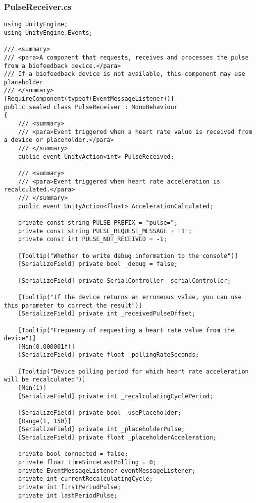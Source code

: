 \subsubsection*{PulseReceiver.cs}
\begin{verbatim}
using UnityEngine;
using UnityEngine.Events;

/// <summary>
/// <para>A component that requests, receives and processes the pulse from a biofeedback device.</para>
/// If a biofeedback device is not available, this component may use placeholder
/// </summary>
[RequireComponent(typeof(EventMessageListener))]
public sealed class PulseReceiver : MonoBehaviour
{
    /// <summary>
    /// <para>Event triggered when a heart rate value is received from a device or placeholder.</para>
    /// </summary>
    public event UnityAction<int> PulseReceived;

    /// <summary>
    /// <para>Event triggered when heart rate acceleration is recalculated.</para>
    /// </summary>
    public event UnityAction<float> AccelerationCalculated;

    private const string PULSE_PREFIX = "pulse=";
    private const string PULSE_REQUEST_MESSAGE = "1";
    private const int PULSE_NOT_RECEIVED = -1;

    [Tooltip("Whether to write debug information to the console")] 
    [SerializeField] private bool _debug = false;

    [SerializeField] private SerialController _serialController;

    [Tooltip("If the device returns an erroneous value, you can use this parameter to correct the result")]
    [SerializeField] private int _receivedPulseOffset;

    [Tooltip("Frequency of requesting a heart rate value from the device")] 
    [Min(0.000001f)] 
    [SerializeField] private float _pollingRateSeconds;

    [Tooltip("Device polling period for which heart rate acceleration will be recalculated")] 
    [Min(1)] 
    [SerializeField] private int _recalculatingCyclePeriod;

    [SerializeField] private bool _usePlaceholder;
    [Range(1, 150)] 
    [SerializeField] private int _placeholderPulse;
    [SerializeField] private float _placeholderAcceleration;

    private bool connected = false;
    private float timeSinceLastPolling = 0;
    private EventMessageListener eventMessageListener;
    private int currentRecalculatingCycle;
    private int firstPeriodPulse;
    private int lastPeriodPulse;


\end{verbatim}
